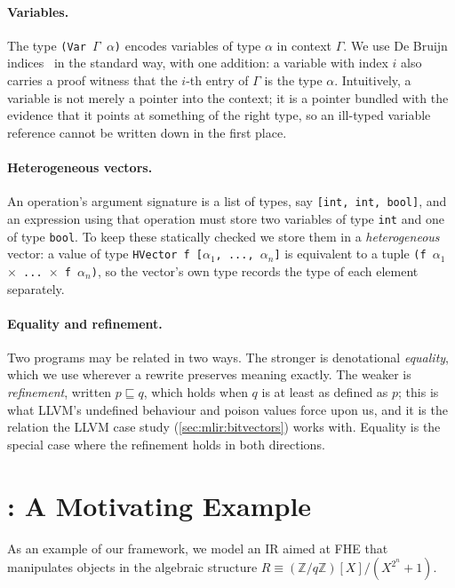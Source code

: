 \paragraph{Variables.}
The type \texttt{(Var $\Gamma$ $\alpha$)} encodes variables of type $\alpha$ in
context $\Gamma$. We use De Bruijn indices~\cite{pierce2002types} in the standard
way, with one addition: a variable with index $i$ also carries a proof witness
that the $i$-th entry of $\Gamma$ is the type $\alpha$. Intuitively, a variable
is not merely a pointer into the context; it is a pointer bundled with the
evidence that it points at something of the right type, so an ill-typed variable
reference cannot be written down in the first place.

\paragraph{Heterogeneous vectors.}
An operation's argument signature is a list of types, say \texttt{[int, int,
bool]}, and an expression using that operation must store two variables of type
\texttt{int} and one of type \texttt{bool}. To keep these statically checked we
store them in a \emph{heterogeneous} vector: a value of type \texttt{HVector f
[$\alpha_1$, ..., $\alpha_n$]} is equivalent to a tuple \texttt{(f $\alpha_1$
$\times$ ... $\times$ f $\alpha_n$)}, so the vector's own type records the type
of each element separately.

\paragraph{Equality and refinement.}
Two programs may be related in two ways. The stronger is denotational
\emph{equality}, which we use wherever a rewrite preserves meaning exactly. The
weaker is \emph{refinement}, written $p \sqsubseteq q$, which holds when $q$ is
at least as defined as $p$; this is what LLVM's undefined behaviour and poison
values force upon us, and it is the relation the LLVM case study
(\cref{sec:mlir:bitvectors}) works with. Equality is the special case where the
refinement holds in both directions. 

\section{\texorpdfstring{}{LeanMLIR(QuotRing)}: A Motivating Example}
\label{sec:mlir:motivation}

As an example of our framework,
we model an IR aimed at FHE that manipulates objects in the algebraic structure $R \equiv (\mathbb{Z}/q\mathbb{Z})[X] / (X^{2^n} + 1)$.


